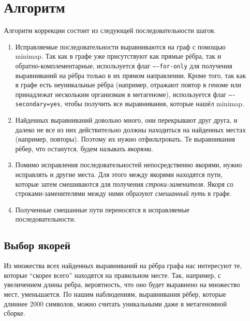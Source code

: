 \documentclass[14pt]{matmex-diploma-custom}
\begin{document}
\section{Алгоритм}
Алгоритм коррекции состоит из следующей последовательности шагов.
\begin{enumerate}
    \item Исправляемые последовательности выравниваются на граф с помощью minimap. Так как в графе уже присутствуют как прямые рёбра, так и обратно-комплементарные, используется флаг \texttt{----for-only} для получения выравниваний на рёбра только в их прямом направлении. Кроме того, так как в графе есть неуникальные рёбра (например, отражают повтор в геноме или принадлежат нескольким организмам в метагеноме), используется флаг \texttt{----secondary=yes}, чтобы получить все выравнивания, которые нашёл minimap.
    \item Найденных выравниваний довольно много, они перекрывают друг друга, и далеко не все из них действительно должны находиться на найденных местах (например, повторы). Поэтому их нужно отфильтровать. Те выравнивания рёбер, что останутся, будем называть \textit{якорями}.
    \item Помимо исправления последовательностей непосредственно якорями, нужно исправлять и другие места. Для этого между якорями находятся пути, которые затем смешиваются для получения \textit{строки-заменителя}. Якоря со строками-заменителями между ними образуют \textit{смешанный путь} в графе.
    \item Полученные смешанные пути переносятся в исправляемые последовательности.
\end{enumerate}

\subsection{Выбор якорей}
Из множества всех найденных выравниваний на рёбра графа нас интересуют те, которые ``скорее всего'' находятся на правильном месте. Так, например, с увеличением длины ребра, вероятность, что оно будет выравнено на множество мест, уменьшается. По нашим наблюдениям, выравнивания рёбер, которые длиннее 2000 символов, можно считать уникальными даже в метагеномной сборке.
\end{document}
